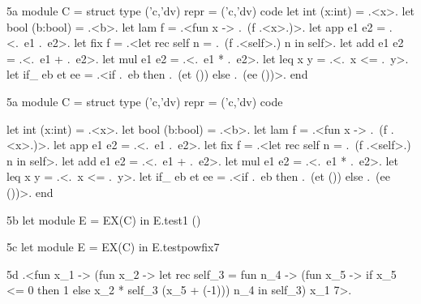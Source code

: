 \ifshort
\begin{SaveVerbatim}{5a}
module C = struct type ('c,'dv) repr = ('c,'dv) code
  let int (x:int)  = .<x>.            let bool (b:bool) = .<b>.
  let lam f        = .<fun x -> .~(f .<x>.)>.
  let app e1 e2    = .<.~e1 .~e2>.
  let fix f =  .<let rec self n = .~(f .<self>.) n in self>.
  let add e1 e2    = .<.~e1 + .~e2>.  let mul e1 e2 = .<.~e1 * .~e2>.
  let leq x y      = .<.~x <= .~y>.
  let if_ eb et ee = .<if .~eb then .~(et ()) else .~(ee ())>. end
\end{SaveVerbatim}
\else
\begin{SaveVerbatim}{5a}
module C = struct
  type ('c,'dv) repr = ('c,'dv) code

  let int (x:int)   = .<x>.
  let bool (b:bool) = .<b>.
  let lam f         = .<fun x -> .~(f .<x>.)>.
  let app e1 e2     = .<.~e1 .~e2>.
  let fix f         = .<let rec self n = .~(f .<self>.) n in self>.
  let add e1 e2     = .<.~e1 + .~e2>.
  let mul e1 e2     = .<.~e1 * .~e2>.
  let leq x y       = .<.~x <= .~y>.
  let if_ eb et ee  = .<if .~eb then .~(et ()) else .~(ee ())>.
end
\end{SaveVerbatim}
\fi
\begin{SaveVerbatim}{5b}
let module E = EX(C) in E.test1 ()
\end{SaveVerbatim}
\begin{SaveVerbatim}{5c}
let module E = EX(C) in E.testpowfix7
\end{SaveVerbatim}
\begin{SaveVerbatim}{5d}
.<fun x_1 -> (fun x_2 -> let rec self_3 = fun n_4 ->
   (fun x_5 -> if x_5 <= 0 then 1 else x_2 * self_3 (x_5 + (-1)))
   n_4 in self_3) x_1 7>.
\end{SaveVerbatim}


